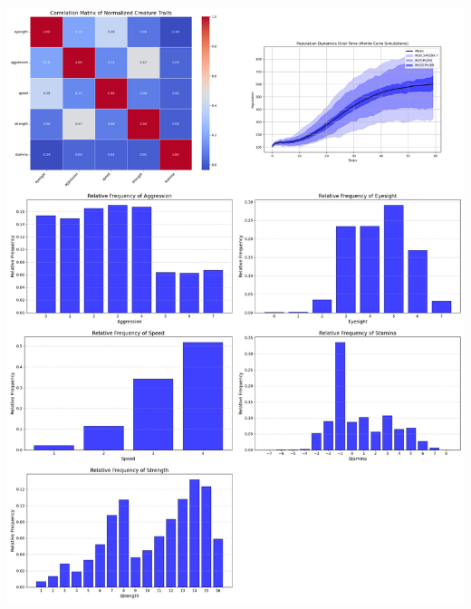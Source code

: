 \documentclass{article}
\begin{document}
\begin{center}
    \includegraphics[scale=0.21]{tests/2.8.jpg}
\end{center}
\end{document}
